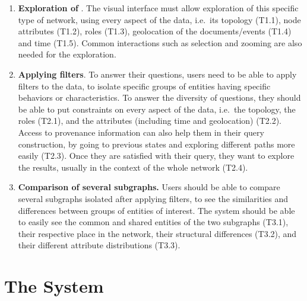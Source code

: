 \begin{enumerate}
    \item \textbf{Exploration of \model}. The visual interface must allow exploration of this specific type of network, using every aspect of the data, i.e.\ its topology (T1.1), node attributes  (T1.2), roles (T1.3), geolocation of the documents/events (T1.4) and time (T1.5).
    Common interactions such as selection and zooming are also needed for the exploration.
    \item \textbf{Applying filters}. To answer their questions, users need to be able to apply filters to the data, to isolate specific groups of entities having specific behaviors or characteristics. To answer the diversity of questions, they should be able to put constraints on every aspect of the data, i.e.\ the topology, the roles (T2.1), and the attributes (including time and geolocation) (T2.2).
    Access to provenance information can also help them in their query construction, by going to previous states and exploring different paths more easily (T2.3). Once they are satisfied with their query, they want to explore the results, usually in the context of the whole network (T2.4).
    \item \textbf{Comparison of several subgraphs.} Users should be able to compare several subgraphs isolated after applying filters, to see the similarities and differences between groups of entities of interest. The system should be able to easily see the common and shared entities of the two subgraphs (T3.1), their respective place in the network, their structural differences (T3.2), and their different attribute distributions (T3.3).
\end{enumerate}




\section{The \name System}\label{sec:system}

